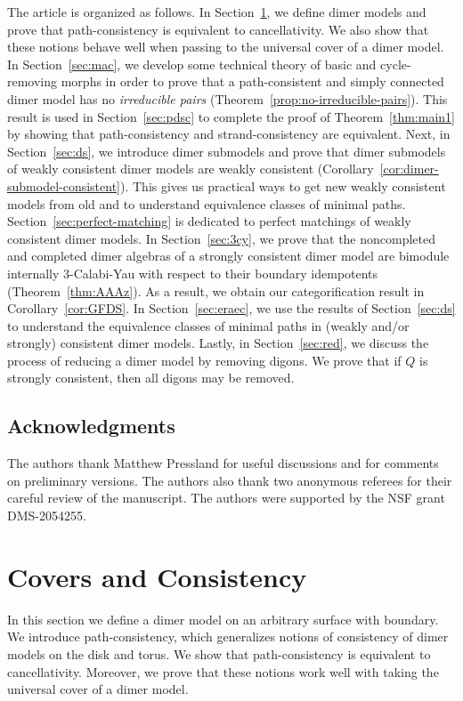 \documentclass{article}
\theoremstyle{definition}
\begin{document}
The article is organized as follows. In Section~\ref{sec:first-section}, we define dimer models and prove that path-consistency is equivalent to cancellativity. We also show that these notions behave well when passing to the universal cover of a dimer model.
In Section~\ref{sec:mac}, we develop some technical theory of basic and cycle-removing morphs in order to prove that a path-consistent and simply connected dimer model has no \textit{irreducible pairs} (Theorem~\ref{prop:no-irreducible-pairs}). This result is used in Section~\ref{sec:pdsc} to complete the proof of Theorem~\ref{thm:main1} by showing that path-consistency and strand-consistency are equivalent.
Next, in Section~\ref{sec:ds}, we introduce dimer submodels and prove that dimer submodels of weakly consistent dimer models are weakly consistent (Corollary~\ref{cor:dimer-submodel-consistent}). 
This gives us practical ways to get new weakly consistent models from old and to understand equivalence classes of minimal paths. 
Section~\ref{sec:perfect-matching} is dedicated to perfect matchings of weakly consistent dimer models. 
In Section~\ref{sec:3cy}, we prove that the noncompleted and completed dimer algebras of a strongly consistent dimer model are bimodule internally 3-Calabi-Yau with respect to their boundary idempotents (Theorem~\ref{thm:AAAz}). 
As a result, we obtain our categorification result in Corollary~\ref{cor:GFDS}.
In Section~\ref{sec:eraec}, we use the results of Section~\ref{sec:ds} to understand the equivalence classes of minimal paths in (weakly and/or strongly) consistent dimer models.
Lastly, in Section~\ref{sec:red}, we discuss the process of reducing a dimer model by removing digons. We prove that if $Q$ is strongly consistent, then all digons may be removed.

\subsection*{Acknowledgments}

The authors thank Matthew Pressland for useful discussions and for comments on preliminary versions. The authors also thank two anonymous referees for their careful review of the manuscript.
The authors were supported by the NSF grant DMS-2054255.

\section{Covers and Consistency}\label{sec:first-section}

In this section we define a dimer model on an arbitrary surface with boundary. We introduce {path-consistency}, which generalizes notions of consistency of dimer models on the disk and torus. We show that path-consistency is equivalent to cancellativity. Moreover, we prove that these notions work well with taking the universal cover of a dimer model.
\end{document}
